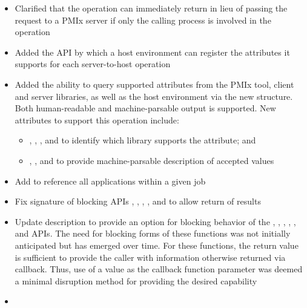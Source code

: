 \begin{itemize}
    \item Clarified that the  operation can immediately return  in lieu of passing the request to a \ac{PMIx} server if only the calling process is involved in the operation
    \item Added the  \ac{API} by which a host environment can register the attributes it supports for each server-to-host operation
    \item Added the ability to query supported attributes from the \ac{PMIx} tool, client and server libraries, as well as the host environment via the new  structure. Both human-readable and machine-parsable output is supported. New attributes to support this operation include:
    \begin{itemize}
        \item {}, , , and  to identify which library supports the attribute; and
        \item {}, , and  to provide machine-parsable description of accepted values
    \end{itemize}
    \item Add  to reference all applications within a given job
    \item Fix signature of blocking APIs , , , , and  to allow return of results
    \item Update description to provide an option for blocking behavior of the , , , , , and  APIs. The need for blocking forms of these functions was not initially anticipated but has emerged over time. For these functions, the return value is sufficient to provide the caller with information otherwise returned via callback. Thus, use of a  value as the callback function parameter was deemed a minimal disruption method for providing the desired capability
    \item
\end{itemize}
